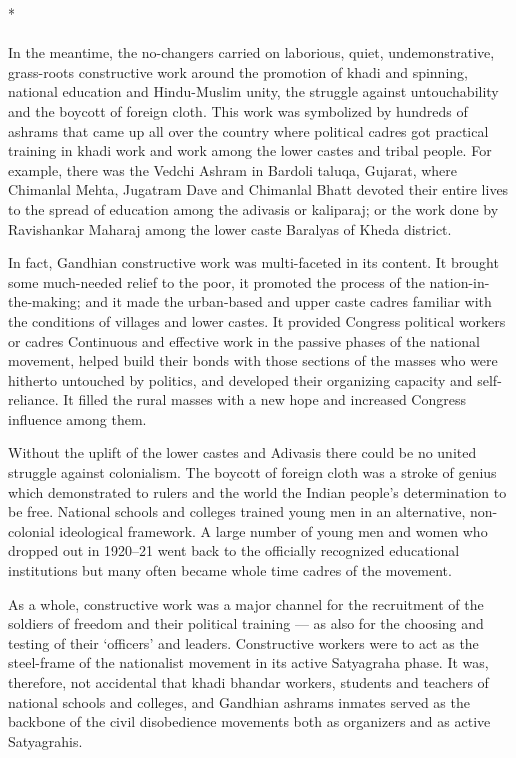 \begin{multicols}{2}
\begin{center}*\end{center}

\paragraph*{}
In the meantime, the no-changers carried on laborious, quiet, undemonstrative, grass-roots constructive work around the promotion of khadi and spinning, national education and Hindu-Muslim unity, the struggle against untouchability and the boycott of foreign cloth. This work was symbolized by hundreds of ashrams that came up all over the country where political cadres got practical training in khadi work and work among the lower castes and tribal people. For example, there was the Vedchi Ashram in Bardoli taluqa, Gujarat, where Chimanlal Mehta, Jugatram Dave and Chimanlal Bhatt devoted their entire lives to the spread of education among the adivasis or kaliparaj; or the work done by Ravishankar Maharaj among the lower caste Baralyas of Kheda district.

In fact, Gandhian constructive work was multi-faceted in its content. It brought some much-needed relief to the poor, it promoted the process of the nation-in-the-making; and it made the urban-based and upper caste cadres familiar with the conditions of villages and lower castes. It provided Congress political workers or cadres Continuous and effective work in the passive phases of the national movement, helped build their bonds with those sections of the masses who were hitherto untouched by politics, and developed their organizing capacity and self-reliance. It filled the rural masses with a new hope and increased Congress influence among them.

Without the uplift of the lower castes and Adivasis there could be no united struggle against colonialism. The boycott of foreign cloth was a stroke of genius which demonstrated to rulers and the world the Indian people's determination to be free. National schools and colleges trained young men in an alternative, non-colonial ideological framework. A large number of young men and women who dropped out in 1920--21 went back to the officially recognized educational institutions but many often became whole time cadres of the movement.

As a whole, constructive work was a major channel for the recruitment of the soldiers of freedom and their political training --- as also for the choosing and testing of their `officers' and leaders. Constructive workers were to act as the steel-frame of the nationalist movement in its active Satyagraha phase. It was, therefore, not accidental that khadi bhandar workers, students and teachers of national schools and colleges, and Gandhian ashrams inmates served as the backbone of the civil disobedience movements both as organizers and as active Satyagrahis.


\end{multicols}
